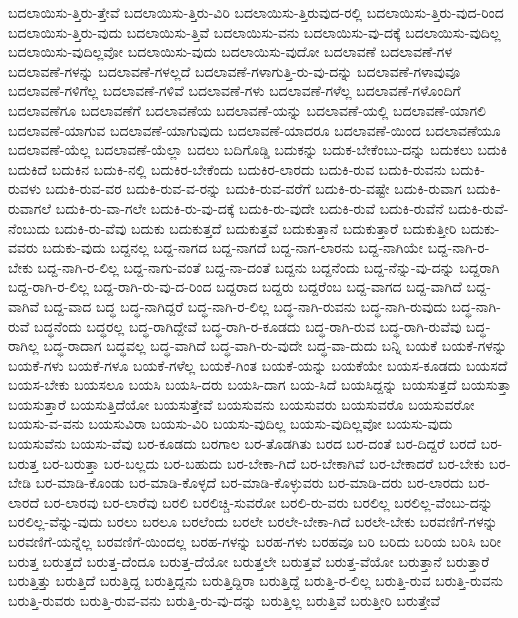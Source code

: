 {ಬದಲಾಯಿಸು-ತ್ತಿರು-ತ್ತೇವೆ
ಬದಲಾಯಿಸು-ತ್ತಿರು-ವಿರಿ
ಬದಲಾಯಿಸು-ತ್ತಿರುವುದ-ರಲ್ಲಿ
ಬದಲಾಯಿಸು-ತ್ತಿರು-ವುದ-ರಿಂದ
ಬದಲಾಯಿಸು-ತ್ತಿರು-ವುದು
ಬದಲಾಯಿಸು-ತ್ತಿವೆ
ಬದಲಾಯಿಸು-ವನು
ಬದಲಾಯಿಸು-ವು-ದಕ್ಕೆ
ಬದಲಾಯಿಸು-ವುದಿಲ್ಲ
ಬದಲಾಯಿಸು-ವುದಿಲ್ಲವೋ
ಬದಲಾಯಿಸು-ವುದು
ಬದಲಾಯಿಸು-ವುದೋ
ಬದಲಾವಣೆ
ಬದಲಾವಣೆ-ಗಳ
ಬದಲಾವಣೆ-ಗಳನ್ನು
ಬದಲಾವಣೆ-ಗಳಲ್ಲದೆ
ಬದಲಾವಣೆ-ಗಳಾಗುತ್ತಿ-ರು-ವು-ದನ್ನು
ಬದಲಾವಣೆ-ಗಳಾವುವೂ
ಬದಲಾವಣೆ-ಗಳಿಗೆಲ್ಲ
ಬದಲಾವಣೆ-ಗಳಿವೆ
ಬದಲಾವಣೆ-ಗಳು
ಬದಲಾವಣೆ-ಗಳೆಲ್ಲ
ಬದಲಾವಣೆ-ಗಳೊಂದಿಗೆ
ಬದಲಾವಣೆಗೂ
ಬದಲಾವಣೆಗೆ
ಬದಲಾವಣೆಯ
ಬದಲಾವಣೆ-ಯನ್ನು
ಬದಲಾವಣೆ-ಯಲ್ಲಿ
ಬದಲಾವಣೆ-ಯಾಗಲಿ
ಬದಲಾವಣೆ-ಯಾಗುವ
ಬದಲಾವಣೆ-ಯಾಗುವುದು
ಬದಲಾವಣೆ-ಯಾದರೂ
ಬದಲಾವಣೆ-ಯಿಂದ
ಬದಲಾವಣೆಯೂ
ಬದಲಾವಣೆ-ಯೆಲ್ಲ
ಬದಲಾವಣೆ-ಯೆಲ್ಲಾ
ಬದಲು
ಬದಿಗೊಡ್ಡಿ
ಬದುಕನ್ನು
ಬದುಕ-ಬೇಕೆಂಬು-ದನ್ನು
ಬದುಕಲು
ಬದುಕಿ
ಬದುಕಿದೆ
ಬದುಕಿನ
ಬದುಕಿ-ನಲ್ಲಿ
ಬದುಕಿರ-ಬೇಕೆಂದು
ಬದುಕಿರ-ಲಾರದು
ಬದುಕಿ-ರುವ
ಬದುಕಿ-ರುವನು
ಬದುಕಿ-ರುವಳು
ಬದುಕಿ-ರುವ-ವರ
ಬದುಕಿ-ರುವ-ವ-ರನ್ನು
ಬದುಕಿ-ರುವ-ವರೆಗೆ
ಬದುಕಿ-ರು-ವಷ್ಟೇ
ಬದುಕಿ-ರುವಾಗ
ಬದುಕಿ-ರುವಾಗಲೆ
ಬದುಕಿ-ರು-ವಾ-ಗಲೇ
ಬದುಕಿ-ರು-ವು-ದಕ್ಕೆ
ಬದುಕಿ-ರು-ವುದೇ
ಬದುಕಿ-ರುವೆ
ಬದುಕಿ-ರುವೆನೆ
ಬದುಕಿ-ರುವೆ-ನೆಂಬುದು
ಬದುಕಿ-ರು-ವೆವು
ಬದುಕು
ಬದುಕುತ್ತದೆ
ಬದುಕುತ್ತವೆ
ಬದುಕುತ್ತಾನೆ
ಬದುಕುತ್ತಾರೆ
ಬದುಕುತ್ತೀರಿ
ಬದುಕು-ವವರು
ಬದುಕು-ವುದು
ಬದ್ದನಲ್ಲ
ಬದ್ದ-ನಾಗದ
ಬದ್ದ-ನಾಗದೆ
ಬದ್ದ-ನಾಗ-ಲಾರನು
ಬದ್ದ-ನಾಗಿಯೇ
ಬದ್ದ-ನಾಗಿ-ರ-ಬೇಕು
ಬದ್ದ-ನಾಗಿ-ರ-ಲಿಲ್ಲ
ಬದ್ದ-ನಾಗು-ವಂತೆ
ಬದ್ದ-ನಾ-ದಂತೆ
ಬದ್ದನು
ಬದ್ದನೆಂದು
ಬದ್ದ-ನೆನ್ನು-ವು-ದನ್ನು
ಬದ್ದರಾಗಿ
ಬದ್ದ-ರಾಗಿ-ರ-ಲಿಲ್ಲ
ಬದ್ದ-ರಾಗಿ-ರು-ವು-ದ-ರಿಂದ
ಬದ್ದರಾದ
ಬದ್ದರು
ಬದ್ದರೆಂಬ
ಬದ್ದ-ವಾಗದ
ಬದ್ದ-ವಾಗಿದೆ
ಬದ್ದ-ವಾಗಿವೆ
ಬದ್ದ-ವಾದ
ಬದ್ಧ
ಬದ್ಧ-ನಾಗಿದ್ದರೆ
ಬದ್ಧ-ನಾಗಿ-ರ-ಲಿಲ್ಲ
ಬದ್ಧ-ನಾಗಿ-ರುವನು
ಬದ್ಧ-ನಾಗಿ-ರುವುದು
ಬದ್ಧ-ನಾಗಿ-ರುವೆ
ಬದ್ಧನೆಂದು
ಬದ್ಧರಲ್ಲ
ಬದ್ಧ-ರಾಗಿದ್ದೇವೆ
ಬದ್ಧ-ರಾಗಿ-ರ-ಕೂಡದು
ಬದ್ಧ-ರಾಗಿ-ರುವ
ಬದ್ಧ-ರಾಗಿ-ರುವೆವು
ಬದ್ಧ-ರಾಗಿಲ್ಲ
ಬದ್ಧ-ರಾದಾಗ
ಬದ್ಧವಲ್ಲ
ಬದ್ಧ-ವಾಗಿದೆ
ಬದ್ಧ-ವಾಗಿ-ರು-ವುದೇ
ಬದ್ಧ-ವಾ-ದುದು
ಬನ್ನಿ
ಬಯಕೆ
ಬಯಕೆ-ಗಳನ್ನು
ಬಯಕೆ-ಗಳು
ಬಯಕೆ-ಗಳೂ
ಬಯಕೆ-ಗಳೆಲ್ಲ
ಬಯಕೆ-ಗಿಂತ
ಬಯಕೆ-ಯನ್ನು
ಬಯಕೆಯೇ
ಬಯಸ-ಕೂಡದು
ಬಯಸದೆ
ಬಯಸ-ಬೇಕು
ಬಯಸಲೂ
ಬಯಸಿ
ಬಯಸಿ-ದರು
ಬಯಸಿ-ದಾಗ
ಬಯ-ಸಿದೆ
ಬಯಸಿದ್ದನ್ನು
ಬಯಸುತ್ತದೆ
ಬಯಸುತ್ತಾ
ಬಯಸುತ್ತಾರೆ
ಬಯಸುತ್ತಿದೆಯೋ
ಬಯಸುತ್ತೇವೆ
ಬಯಸುವನು
ಬಯಸುವರು
ಬಯಸುವರೊ
ಬಯಸುವರೋ
ಬಯಸು-ವ-ವನು
ಬಯಸುವಿರಾ
ಬಯಸು-ವಿರಿ
ಬಯಸು-ವುದಿಲ್ಲ
ಬಯಸು-ವುದಿಲ್ಲವೋ
ಬಯಸು-ವುದು
ಬಯಸುವೆನು
ಬಯಸು-ವೆವು
ಬರ-ಕೂಡದು
ಬರಗಾಲ
ಬರ-ತೊಡಗಿತು
ಬರದ
ಬರ-ದಂತೆ
ಬರ-ದಿದ್ದರೆ
ಬರದೆ
ಬರ-ಬರುತ್ತ
ಬರ-ಬರುತ್ತಾ
ಬರ-ಬಲ್ಲದು
ಬರ-ಬಹುದು
ಬರ-ಬೇಕಾ-ಗಿದೆ
ಬರ-ಬೇಕಾಗಿವೆ
ಬರ-ಬೇಕಾದರೆ
ಬರ-ಬೇಕು
ಬರ-ಬೇಡಿ
ಬರ-ಮಾಡಿ-ಕೊಂಡು
ಬರ-ಮಾಡಿ-ಕೊಳ್ಳದೆ
ಬರ-ಮಾಡಿ-ಕೊಳ್ಳುವರು
ಬರ-ಮಾಡಿ-ದರು
ಬರ-ಲಾರದು
ಬರ-ಲಾರದೆ
ಬರ-ಲಾರವು
ಬರ-ಲಾರೆವು
ಬರಲಿ
ಬರಲಿಚ್ಚಿ-ಸುವರೋ
ಬರಲಿ-ರು-ವರು
ಬರಲಿಲ್ಲ
ಬರಲಿಲ್ಲ-ವೆಂಬು-ದನ್ನು
ಬರಲಿಲ್ಲ-ವೆನ್ನು-ವುದು
ಬರಲು
ಬರಲೂ
ಬರಲೆಂದು
ಬರಲೇ
ಬರಲೇ-ಬೇಕಾ-ಗಿದೆ
ಬರಲೇ-ಬೇಕು
ಬರವಣಿಗೆ-ಗಳನ್ನು
ಬರವಣಿಗೆ-ಯನ್ನೆಲ್ಲ
ಬರವಣಿಗೆ-ಯಿಂದಲ್ಲ
ಬರಹ-ಗಳನ್ನು
ಬರಹ-ಗಳು
ಬರಹವೂ
ಬರಿ
ಬರಿದು
ಬರಿಯ
ಬರಿಸಿ
ಬರೀ
ಬರುತ್ತ
ಬರುತ್ತದೆ
ಬರುತ್ತ-ದೆಂದೂ
ಬರುತ್ತ-ದೆಯೋ
ಬರುತ್ತಲೇ
ಬರುತ್ತವೆ
ಬರುತ್ತ-ವೆಯೋ
ಬರುತ್ತಾನೆ
ಬರುತ್ತಾರೆ
ಬರುತ್ತಿತ್ತು
ಬರುತ್ತಿದೆ
ಬರುತ್ತಿದ್ದ
ಬರುತ್ತಿದ್ದನು
ಬರುತ್ತಿದ್ದಿರಾ
ಬರುತ್ತಿದ್ದೆ
ಬರುತ್ತಿ-ರ-ಲಿಲ್ಲ
ಬರುತ್ತಿ-ರುವ
ಬರುತ್ತಿ-ರುವನು
ಬರುತ್ತಿ-ರುವರು
ಬರುತ್ತಿ-ರುವ-ವನು
ಬರುತ್ತಿ-ರು-ವು-ದನ್ನು
ಬರುತ್ತಿಲ್ಲ
ಬರುತ್ತಿವೆ
ಬರುತ್ತೀರಿ
ಬರುತ್ತೇವೆ
}
